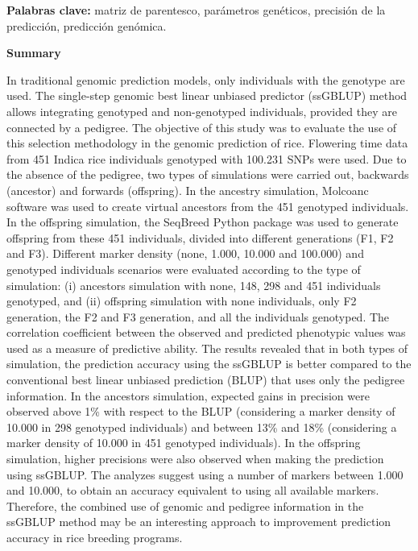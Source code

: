 \documentclass[11pt,spanish,a4paper,oneside,]{book} %
\begin{document}
\hspace*{1em}

\noindent 
\textbf{Palabras clave:} matriz de parentesco, parámetros genéticos, precisión de la predicción, predicción genómica.

\newpage

\noindent 

\noindent 
\textbf{Summary}

\hspace*{1em}

\noindent 
In traditional genomic prediction models, only individuals with the genotype are used. The single-step genomic best linear unbiased predictor (ssGBLUP) method allows integrating genotyped and non-genotyped individuals, provided they are connected by a pedigree. The objective of this study was to evaluate the use of this selection methodology in the genomic prediction of rice. Flowering time data from 451 Indica rice individuals genotyped with 100.231 SNPs were used. Due to the absence of the pedigree, two types of simulations were carried out, backwards (ancestor) and forwards (offspring). In the ancestry simulation, Molcoanc software was used to create virtual ancestors from the 451 genotyped individuals. In the offspring simulation, the SeqBreed Python package was used to generate offspring from these 451 individuals, divided into different generations (F1, F2 and F3). Different marker density (none, 1.000, 10.000 and 100.000) and genotyped individuals scenarios were evaluated according to the type of simulation: (i) ancestors simulation with none, 148, 298 and 451 individuals genotyped, and (ii) offspring simulation with none individuals, only F2 generation, the F2 and F3 generation, and all the individuals genotyped. The correlation coefficient between the observed and predicted phenotypic values was used as a measure of predictive ability. The results revealed that in both types of simulation, the prediction accuracy using the ssGBLUP is better compared to the conventional best linear unbiased prediction (BLUP) that uses only the pedigree information. In the ancestors simulation, expected gains in precision were observed above 1\% with respect to the BLUP (considering a marker density of 10.000 in 298 genotyped individuals) and between 13\% and 18\% (considering a marker density of 10.000 in 451 genotyped individuals). In the offspring simulation, higher precisions were also observed when making the prediction using ssGBLUP. The analyzes suggest using a number of markers between 1.000 and 10.000, to obtain an accuracy equivalent to using all available markers. Therefore, the combined use of genomic and pedigree information in the ssGBLUP method may be an interesting approach to improvement prediction accuracy in rice breeding programs.
\end{document}
